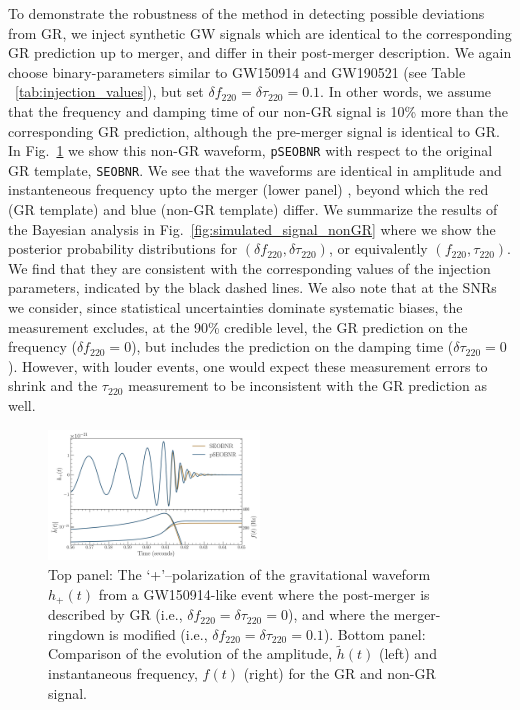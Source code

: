 \documentclass[twocolumn,prd,aps,superscriptaddress,preprintnumbers,tightenlines,showpacs,nofootinbib,eqsecnum,amsfonts,amsmath]{revtex4-1}
\newcommand{\abhi}[1]{\textcolor{Emerald}{#1}}
\newcommand{\df}[1]{\delta f_{\text{#1}}}
\newcommand{\dtau}[1]{\delta \tau_{\text{#1}}}
\newcommand{\fngr}[1]{f_{\text{#1}}}
\newcommand{\taungr}[1]{\tau_{\text{#1}}}
\begin{document}
To demonstrate the robustness of the method in detecting possible
deviations from GR, we inject synthetic GW signals which are identical to
the corresponding GR prediction up to merger, and differ in their post-merger
description. We again choose binary-parameters
similar to GW150914 and GW190521 (see Table ~\ref{tab:injection_values}), but
set $\df{220} = \dtau{220} = 0.1 $.
In other words, we assume that the frequency and damping time
of our non-GR signal is 10\% more than the corresponding GR prediction,
although the pre-merger signal is identical to GR. In Fig.~\ref{fig:nongr_waveform}
we show this non-GR waveform, \texttt{pSEOBNR} with respect to the 
original GR template, \texttt{SEOBNR}. We see that the waveforms are identical in amplitude
and instanteneous frequency upto the merger (lower panel) , beyond which the 
red (GR template) and blue (non-GR template) differ. We summarize the results of the Bayesian analysis in Fig.~\ref{fig:simulated_signal_nonGR} where we
show the posterior probability distributions for $(\df{220}, \dtau{220})$, or equivalently
$(\fngr{220}, \taungr{220})$. We find that they are consistent with the corresponding
values of the injection parameters, indicated by the black dashed lines. 
\abhi{We also note that at the SNRs we consider, since statistical uncertainties dominate systematic biases, the measurement excludes, at the 90\% credible level, the GR prediction on the frequency ($\df{220}=0$), but includes the prediction on the damping time ($\dtau{220}=0$). However, with louder events, one would expect these measurement errors to shrink and the $\taungr{220}$ measurement to be inconsistent with the GR prediction as well.}

\begin{figure}
        \includegraphics[width=0.5\textwidth]{figures/modGR_waveforms_amplitudephase.png}
        \caption{Top panel: The `+'--polarization of the gravitational waveform $h_+(t)$ from a GW150914-like event where the post-merger is described by GR (i.e., $\df{220} = \dtau{220} = 0$), and where the merger-ringdown is modified (i.e., $\df{220} = \dtau{220} = 0.1$). Bottom panel: Comparison of the evolution of the amplitude, $\tilde{h}(t)$ (left) and instantaneous frequency, $f(t)$ (right) for the GR and non-GR signal.}
        \label{fig:nongr_waveform}
\end{figure}
\end{document}
